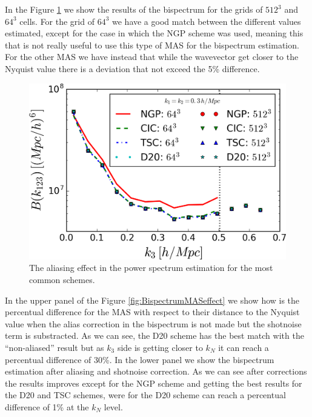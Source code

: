 \documentclass[a4paper,fleqn,usenatbib]{mnras}
\begin{document}
In the Figure \ref{fig:bispectrum_plot} we show the results of the bispectrum for the grids of 
$512^3$ and $64^3$ cells. For the grid of $64^3$ we have a good match between the different values 
estimated, except for the case in which the NGP scheme was used, meaning this that is not really 
useful to use this type of MAS for the bispectrum estimation. For the other MAS we have instead that
while the wavevector get closer to the Nyquist value there is a deviation that 
not exceed the 5\% 
difference. 


\begin{figure}
  \centering
  \includegraphics[width=1\columnwidth]{images/Bispectrum_plot.png}
  \caption{The aliasing effect in the power spectrum estimation for the most
  common schemes.}\label{fig:bispectrum_plot}
\end{figure}

In the upper panel of the Figure \ref{fig:BispectrumMASeffect} we show how is the percentual 
difference for the MAS with respect to their distance to the Nyquist value when the alias 
correction in the bispectrum is not made but the shotnoise term is substracted. As we can see, the 
D20 scheme has the best match with the ``non-aliased'' result but as $k_3$ side is getting closer 
to $k_N$ it can reach a percentual difference of 30\%. In the lower panel we show 
the bispectrum estimation after aliasing and shotnoise correction. As we can see after corrections 
the results improves except for the NGP scheme and getting the best results for the D20 and TSC 
schemes, were for the D20 scheme can reach a percentual difference of 1\% at the $k_N$ level.
\end{document}

